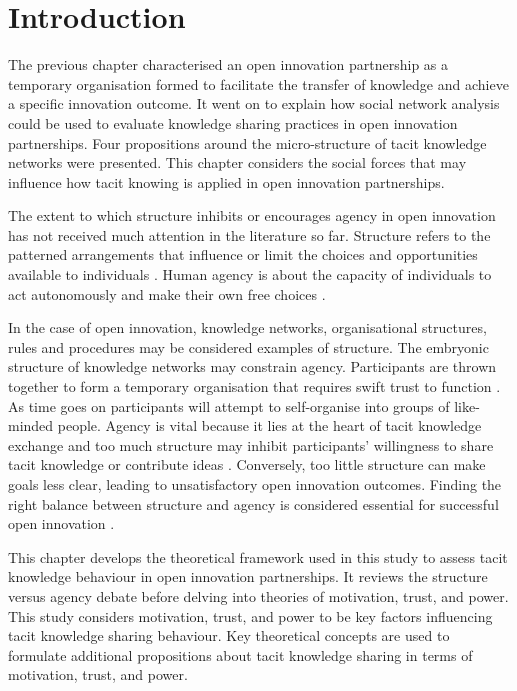\section{Introduction}

The previous chapter characterised an open innovation partnership as a temporary organisation formed to facilitate the transfer of knowledge and achieve a specific innovation outcome. It went on to explain how social network analysis could be used to evaluate knowledge sharing practices in open innovation partnerships. Four propositions around the micro-structure of tacit knowledge networks were presented. This chapter considers the social forces that may influence how tacit knowing is applied in open innovation partnerships. \medskip

The extent to which structure inhibits or encourages agency in open innovation has not received much attention in the literature so far. Structure refers to the patterned arrangements that influence or limit the choices and opportunities available to individuals \citep{bandura1999social}. Human agency is about the capacity of individuals to act autonomously and make their own free choices \citep{giddens1984constitution,emirbayer1994network}. \medskip

In the case of open innovation, knowledge networks, organisational structures, rules and procedures may be considered examples of structure. The embryonic structure of knowledge networks may constrain agency. Participants are thrown together to form a temporary organisation that requires swift trust to function \citep{meyerson1996swift}. As time goes on participants will attempt to self-organise into groups of like-minded people. Agency is vital because it lies at the heart of tacit knowledge exchange and too much structure may inhibit participants' willingness to share tacit knowledge or contribute ideas \citep{lam2000tacit}. Conversely, too little structure can make goals less clear, leading to unsatisfactory open innovation outcomes. Finding the right balance between structure and agency is considered essential for successful open innovation \citep{davis2010agency}. \medskip

This chapter develops the theoretical framework used in this study to assess tacit knowledge behaviour in open innovation partnerships. It reviews the structure versus agency debate before delving into theories of motivation, trust, and power. This study considers motivation, trust, and power to be key factors influencing tacit knowledge sharing behaviour. Key theoretical concepts are used to formulate additional propositions about tacit knowledge sharing in terms of motivation, trust, and power. 

